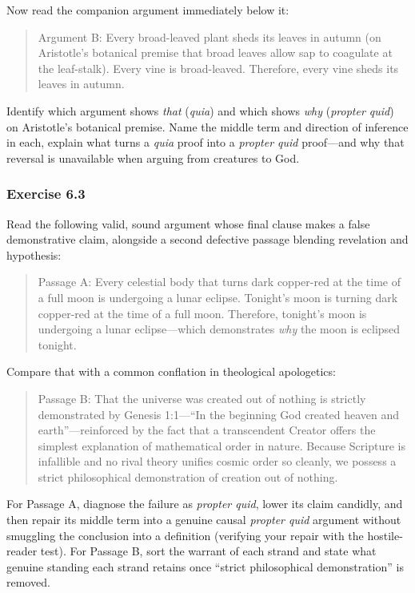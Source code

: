 Now read the companion argument immediately below it:

\begin{quote}
Argument B: Every broad-leaved plant sheds its leaves in autumn (on Aristotle's botanical premise that broad leaves allow sap to coagulate at the leaf-stalk). Every vine is broad-leaved. Therefore, every vine sheds its leaves in autumn.
\end{quote}

Identify which argument shows \emph{that} (\emph{quia}) and which shows \emph{why} (\emph{propter quid}) on Aristotle's botanical premise. Name the middle term and direction of inference in each, explain what turns a \emph{quia} proof into a \emph{propter quid} proof---and why that reversal is unavailable when arguing from creatures to God.

\subsubsection*{Exercise 6.3}
Read the following valid, sound argument whose final clause makes a false demonstrative claim, alongside a second defective passage blending revelation and hypothesis:

\begin{quote}
Passage A: Every celestial body that turns dark copper-red at the time of a full moon is undergoing a lunar eclipse. Tonight's moon is turning dark copper-red at the time of a full moon. Therefore, tonight's moon is undergoing a lunar eclipse---which demonstrates \emph{why} the moon is eclipsed tonight.
\end{quote}

Compare that with a common conflation in theological apologetics:

\begin{quote}
Passage B: That the universe was created out of nothing is strictly demonstrated by Genesis 1:1---``In the beginning God created heaven and earth''---reinforced by the fact that a transcendent Creator offers the simplest explanation of mathematical order in nature. Because Scripture is infallible and no rival theory unifies cosmic order so cleanly, we possess a strict philosophical demonstration of creation out of nothing.
\end{quote}

For Passage A, diagnose the failure as \emph{propter quid}, lower its claim candidly, and then repair its middle term into a genuine causal \emph{propter quid} argument without smuggling the conclusion into a definition (verifying your repair with the hostile-reader test). For Passage B, sort the warrant of each strand and state what genuine standing each strand retains once ``strict philosophical demonstration'' is removed.

